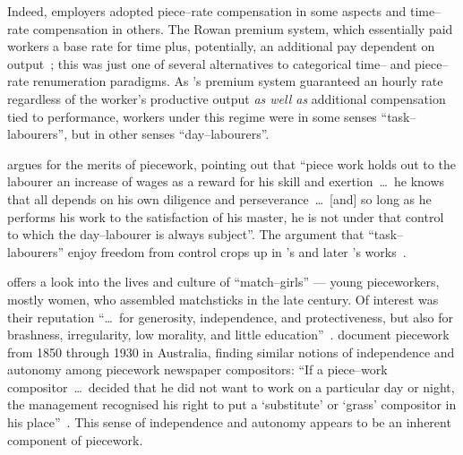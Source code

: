 \documentclass[trackingWork]{subfiles}
\begin{document}
Indeed, employers adopted piece--rate compensation in some aspects and
time--rate compensation in others.
The Rowan premium system,
which essentially paid workers
a base rate for time plus, potentially,
an additional pay dependent on output~\cite{rowan1901premium};
this was just one of several alternatives to categorical time-- and piece--rate renumeration paradigms.
As \citeauthor{rowan1901premium}'s premium system guaranteed an hourly rate
regardless of the worker's productive output
\textit{as well as} additional compensation tied to performance,
workers under this regime were
in some senses ``task--labourers'', but
in other senses ``day--labourers''.

\citeauthor{hughRaynbirdTaskWork} argues for the merits of piecework, %
pointing out that
``piece work holds out to the labourer an increase of wages as a reward for his skill and exertion~\dots~he knows that all depends on his own diligence and perseverance~\dots~[and] so long as he performs his work to the satisfaction of his master, he is not under that control to which the day--labourer is always subject''.
The argument that ``task--labourers'' enjoy freedom from control crops up in \citeauthor{hughRaynbirdTaskWork}'s and later \citeauthor{rowan1901premium}'s works~\cite{hughRaynbirdTaskWork,rowan1901premium}.

\citeauthor{10.2307/3827491} offers a look into the lives and culture of ``match--girls''
--- young pieceworkers, mostly women, who assembled matchsticks in the late  century.
Of interest was their reputation ``\dots~for generosity, independence, and protectiveness,
but also for brashness, irregularity, low morality, and little education''~\cite{10.2307/3827491}.
\citeauthor{10.2307/27508091} document piecework from 1850 through 1930 in Australia,
finding similar notions of independence and autonomy among piecework newspaper compositors:
``If a piece--work compositor~\dots~decided that he did not want to work on a particular day or night,
the management recognised his right to put a `substitute' or `grass' compositor in his place''~\cite{10.2307/27508091}.
This sense of independence and autonomy appears to be an inherent component of piecework.
\end{document}
